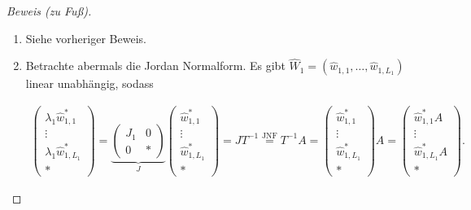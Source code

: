 \begin{proof}[Beweis (zu Fuß)]

    \phantom{}

    \begin{enumerate}[label = (\roman*)]

        \item Siehe vorheriger Beweis.

        \item Betrachte abermals die Jordan Normalform.
        Es gibt $\hat W_1 = (\hat w_{1, 1}, \dots, \hat w_{1, L_1})$ linear unabhängig, sodass
        
        \begin{align*}
            \begin{pmatrix}
                \lambda_1 \hat w_{1,   1}^\ast \\
                \vdots                         \\
                \lambda_1 \hat w_{1, L_1}^\ast \\
                \ast
            \end{pmatrix}
            =
            \underbrace
            {
                \begin{pmatrix}
                    J_1 & 0 \\
                    0   & \ast
                \end{pmatrix}
            }_J
            \begin{pmatrix}
                \hat w_{1,   1}^\ast \\
                \vdots               \\
                \hat w_{1, L_1}^\ast \\
                \ast
            \end{pmatrix}
            =
            J T^{-1}
            \stackrel
            {
                \text{JNF}
            }{=}
            T^{-1} A
            =
            \begin{pmatrix}
                \hat w_{1,   1}^\ast \\
                \vdots               \\
                \hat w_{1, L_1}^\ast \\
                \ast
            \end{pmatrix}
            A
            =
            \begin{pmatrix}
                \hat w_{1,   1}^\ast A \\
                \vdots                 \\
                \hat w_{1, L_1}^\ast A \\
                \ast
            \end{pmatrix}.
        \end{align*}


\end{enumerate}
\end{proof}
